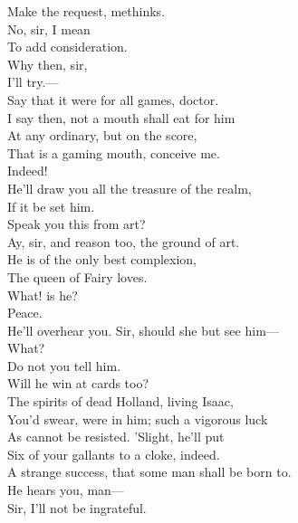 \documentclass[a4paper,oneside]{memoir}
\begin{document}
\begin{drama*}
Make the request, methinks.\\
\dapperspeaks {} No, sir, I mean\\
To add consideration.\\
\facespeaks {} Why then, sir,\\
I'll try.---\\
 Say that it were for all games, doctor.\\
\subtlespeaks I say then, not a mouth shall eat for him\\
At any ordinary, but on the score,\\
That is a gaming mouth, conceive me.\\
\facespeaks {} Indeed!\\
\subtlespeaks He'll draw you all the treasure of the realm,\\
If it be set him.\\
\facespeaks {} Speak you this from art?\\
\subtlespeaks Ay, sir, and reason too, the ground of art.\\
He is of the only best complexion,\\
The queen of Fairy loves.\\
\facespeaks {} What! is he?\\
\subtlespeaks {} Peace.\\
He'll overhear you. Sir, should she but see him---\\
\facespeaks What?\\
\subtlespeaks {} Do not you tell him.\\
\facespeaks {} Will he win at cards too?\\
\subtlespeaks The spirits of dead Holland, living Isaac,\\
You'd swear, were in him; such a vigorous luck\\
As cannot be resisted. 'Slight, he'll put\\
Six of your gallants to a cloke, indeed.\\
\facespeaks A strange success, that some man shall be born to.\\
\subtlespeaks He hears you, man---\\
\dapperspeaks {} Sir, I'll not be ingrateful.\\

\end{drama*}
\end{document}
